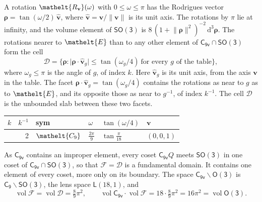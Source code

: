 \documentclass[10pt,a4paper]{article}
\numberwithin{equation}{section}
\newcommand{\eltfont}[1]{{\let\sigma\eltsigma\mathelt{#1}}}
\newcommand{\grp}[1]{\mathsf{#1}}
\newcommand{\cls}[1]{\eltfont{#1}}
\newcommand{\elt}[1]{\eltfont{#1}}
\newcommand{\dirvec}[3]{(#1, #2, #3)}
\newcommand{\unitaxis}{\hat{\mathbf{v}}}
\newcommand{\vv}{\mathbf{v}}
\newcommand{\diff}{\mathrm{d}}
\newcommand{\vol}{\operatorname{vol}}
\newcommand{\rodrigues}{\boldsymbol{\rho}}
\newcommand{\fcell}{\mathcal{D}}
\newcommand{\fdomain}{\mathcal{F}}
\newcommand{\lensspace}[2]{\mathsf{L}(#1, #2)}
\begin{document}
\leavevmode\label{n:vector.rodrigues}\label{n:vector.unitaxis}A rotation $\elt{R_{\vv}}(\omega)$ with $0 \le \omega \le \pi$ has the Rodrigues vector $\rodrigues = \tan(\omega/2)\,\unitaxis$, where $\unitaxis = \vv/\lVert\vv\rVert$ is its unit axis. The rotations by $\pi$ lie at infinity, and the volume element of \href{SO3.pdf}{$\grp{SO(3)}$} is $8\,(1 + \lVert\rodrigues\rVert^2)^{-2}\,\diff^3\rodrigues$.
\leavevmode\label{n:set.cell}The rotations nearer to $\elt{E}$ than to any other element of $\grp{C_{9v}} \cap \grp{SO(3)}$ form the cell
\begin{equation}\label{e:cell}\fcell = \bigl\{\rodrigues : \lvert\rodrigues\cdot\unitaxis_g\rvert \le \tan(\omega_g/4)\ \text{for every $g$ of the table}\bigr\},\end{equation}
where $\omega_g \le \pi$ is the angle of $g$, of index $k$. Here $\unitaxis_g$ is its unit axis, from the axis $\vv$ in the table. The facet $\rodrigues\cdot\unitaxis_g = \tan(\omega_g/4)$ contains the rotations as near to $g$ as to $\elt{E}$, and its opposite those as near to $g^{-1}$, of index $k^{-1}$. The cell $\fcell$ is the unbounded slab between these two facets.
{\small{\renewcommand{\arraystretch}{1.3}\begin{longtable}{@{}rrllll@{}}\toprule
$k$ & $k^{-1}$ & sym & $\omega$ & $\tan(\omega/4)$ & $\vv$\\\midrule\endhead
\bottomrule\endfoot\endlastfoot
1 & 2 & $\cls{C_{9}}$ & $\tfrac{2\pi}{9}$ & $\tan\tfrac{\pi}{18}$ & $\dirvec{0}{0}{1}$\\
\bottomrule\end{longtable}}}

\leavevmode\label{n:set.fundamental}As $\grp{C_{9v}}$ contains an improper element, every coset $\grp{C_{9v}}Q$ meets \href{SO3.pdf}{$\grp{SO(3)}$} in one coset of $\grp{C_{9v}} \cap \grp{SO(3)}$, so that $\fdomain = \fcell$ is a fundamental domain. It contains one element of every coset, more only on its boundary.
\leavevmode\label{n:set.lens}The space $\grp{C_{9v}}\backslash\grp{O(3)}$ is $\grp{C_{9}}\backslash\grp{SO(3)}$, the lens space $\lensspace{18}{1}$, and
\begin{equation}\label{e:volume}\vol\fdomain = \vol\fcell = \tfrac{8}{9}\pi^2,\qquad \vol\grp{C_{9v}}\cdot\vol\fdomain = 18\cdot \tfrac{8}{9}\pi^2 = 16\pi^2 = \vol\grp{O(3)}.\end{equation}
\end{document}
